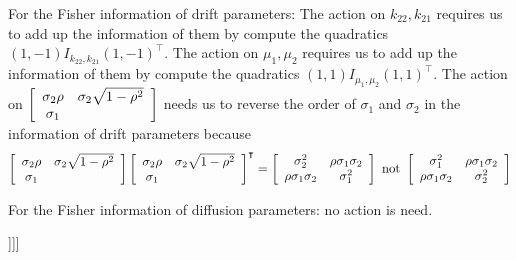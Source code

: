 \documentclass[11pt]{article}%
\theoremstyle{definition}
\begin{document}
For the Fisher information of drift parameters: The action on $k_{22},k_{21}$
requires us to add up the information of them by compute the quadratics
$(1,-1)I_{k_{22},k_{21}}(1,-1)^{\intercal}$. The action on $\mu_{1},\mu_{2}$
requires us to add up the information of them by compute the quadratics
$(1,1)I_{\mu_{1},\mu_{2}}(1,1)^{\intercal}$. The action on $\left[
\begin{array}
[c]{cc}%
{\sigma_{2}\rho} & {\sigma_{2}\sqrt{1-\rho^{2}}}\\
\sigma_{1} &
\end{array}
\right]  $ needs us to reverse the order of $\sigma_{1}$ and $\sigma_{2}$ in
the information of drift parameters because
\[
\left[
\begin{array}
[c]{cc}%
{\sigma_{2}\rho} & {\sigma_{2}\sqrt{1-\rho^{2}}}\\
\sigma_{1} &
\end{array}
\right]  \left[
\begin{array}
[c]{cc}%
{\sigma_{2}\rho} & {\sigma_{2}\sqrt{1-\rho^{2}}}\\
\sigma_{1} &
\end{array}
\right]  ^{\intercal}=\left[
\begin{array}
[c]{cc}%
{\sigma_{2}^{2}} & {\rho\sigma_{1}\sigma_{2}}\\
{\rho\sigma_{1}\sigma_{2}} & {\sigma_{1}^{2}}%
\end{array}
\right]  \text{ not }\left[
\begin{array}
[c]{cc}%
{\sigma_{1}^{2}} & {\rho\sigma_{1}\sigma_{2}}\\
{\rho\sigma_{1}\sigma_{2}} & {\sigma_{2}^{2}}%
\end{array}
\right]
\]


For the Fisher information of diffusion parameters: no action is need.

]]]
\end{document}
